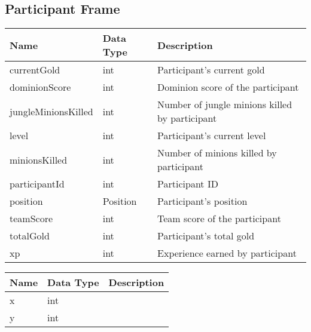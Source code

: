 \subsection{Participant Frame}
\begin{table}[!h]
\footnotesize
\centering
\begin{tabular}{llp{5cm}}
\textbf{Name}       & \textbf{Data Type} & \textbf{Description}                           \\ \hline
currentGold         & int                & Participant's current gold                     \\ \hline
dominionScore       & int                & Dominion score of the participant              \\ \hline
jungleMinionsKilled & int                & Number of jungle minions killed by participant \\ \hline
level               & int                & Participant's current level                    \\ \hline
minionsKilled       & int                & Number of minions killed by participant        \\ \hline
participantId       & int                & Participant ID                                 \\ \hline
position            & Position           & Participant's position                         \\ \hline
teamScore           & int                & Team score of the participant                  \\ \hline
totalGold           & int                & Participant's total gold                       \\ \hline
xp                  & int                & Experience earned by participant               \\ \hline
\end{tabular}
\end{table}

\FloatBarrier
\begin{table}[!h]
\footnotesize
\centering
\begin{tabular}{llp{5cm}}
\textbf{Name} & \textbf{Data Type} & \textbf{Description} \\ \hline
x             & int                &                      \\ \hline
y             & int                &                      \\ \hline
\end{tabular}
\end{table}